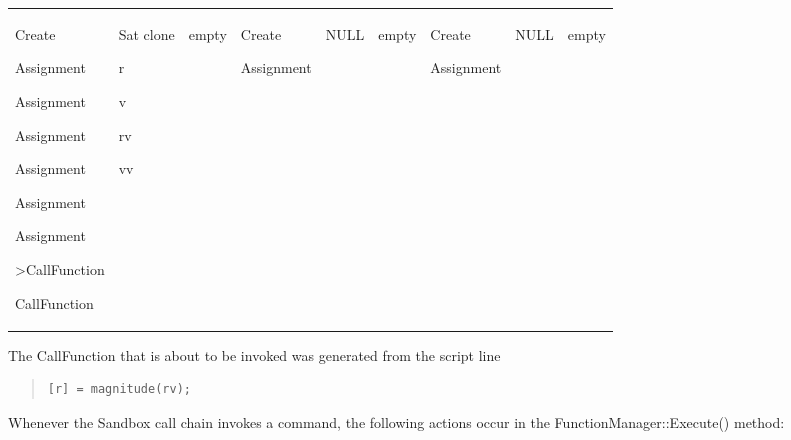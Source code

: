 \begin{center}
\begin{supertabular}{|p{0.75in}|p{0.45in}|p{0.45in}|p{0.69in}|p{0.45in}|p{0.45in}|p{0.69in}|
p{0.44in}|p{0.44in}|}
\begin{small}
Create

Assignment

Assignment

Assignment

Assignment

Assignment

Assignment

>CallFunction

CallFunction
\end{small} &
\begin{small}
Sat clone

r

v

rv

vv
\end{small} &
\begin{small}
empty
\end{small} &
\begin{small}
Create

Assignment
\end{small} &
\begin{small}
NULL
\end{small} &
\begin{small}
empty
\end{small} &
\begin{small}
Create

Assignment
\end{small} &
\begin{small}
NULL
\end{small} &
\begin{small}
empty
\end{small} \\
\end{supertabular}
\end{center}

\noindent The CallFunction that is about to be invoked was generated from the script line

\begin{quote}
\begin{verbatim}
[r] = magnitude(rv);
\end{verbatim}
\end{quote}

Whenever the Sandbox call chain invokes a command, the following actions occur in the
FunctionManager\-::Execute() method:

